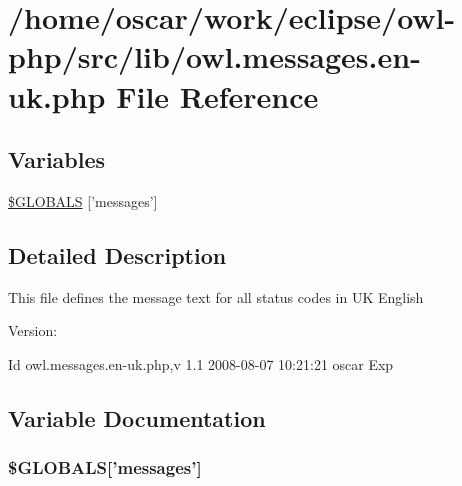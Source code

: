\hypertarget{owl_8messages_8en-uk_8php}{
\section{/home/oscar/work/eclipse/owl-php/src/lib/owl.messages.en-uk.php File Reference}
\label{owl_8messages_8en-uk_8php}
}
\subsection*{Variables}
\begin{CompactItemize}
\item 
\hyperlink{owl_8messages_8en-uk_8php_65f2996116eed36e9ab25f254a470259}{\$GLOBALS} \mbox{[}'messages'\mbox{]}
\end{CompactItemize}


\subsection{Detailed Description}
This file defines the message text for all status codes in UK English \begin{Desc}
\item[Version:]\end{Desc}
\begin{Desc}
\item[Id]owl.messages.en-uk.php,v 1.1 2008-08-07 10:21:21 oscar Exp \end{Desc}


\subsection{Variable Documentation}
\hypertarget{owl_8messages_8en-uk_8php_65f2996116eed36e9ab25f254a470259}{
\subsubsection{\setlength{\rightskip}{0pt plus 5cm}\$GLOBALS\mbox{[}'messages'\mbox{]}}}
\label{owl_8messages_8en-uk_8php_65f2996116eed36e9ab25f254a470259}


